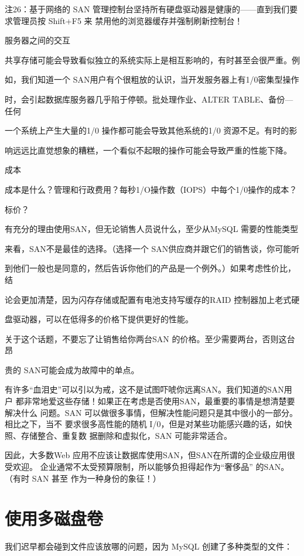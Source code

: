 注26：基于网络的 SAN 管理控制台坚持所有硬盘驱动器是健康的——直到我们要求管理员按 Shift+F5 来
禁用他的浏览器缓存并强制刷新控制台！

服务器之间的交互

共享存储可能会导致看似独立的系统实际上是相互影响的，有时甚至会很严重。例

如，我们知道一个 SAN用户有个很粗放的认识，当开发服务器上有1/0密集型操作

时，会引起数据库服务器几乎陷于停顿。批处理作业、ALTER TABLE、备份—任何

一个系统上产生大量的1/0 操作都可能会导致其他系统的1/0 资源不足。有时的影

响远远比直觉想象的糟糕，一个看似不起眼的操作可能会导致严重的性能下降。

成本

成本是什么？管理和行政费用？每秒1/O操作数（IOPS）中每个1/0操作的成本？

标价？

有充分的理由使用SAN，但无论销售人员说什么，至少从MySQL 需要的性能类型

来看，SAN不是最佳的选择。（选择一个 SAN供应商并跟它们的销售谈，你可能听

到他们一般也是同意的，然后告诉你他们的产品是一个例外。）如果考虑性价比，结

论会更加清楚，因为闪存存储或配置有电池支持写缓存的RAID 控制器加上老式硬

盘驱动器，可以在低得多的价格下提供更好的性能。

关于这个话题，不要忘了让销售给你两台SAN 的价格。至少需要两台，否则这台昂

贵的 SAN可能会成为故障中的单点。

有许多“血泪史”可以引以为戒，这不是试图吓唬你远离SAN。我们知道的SAN用户
都非常地爱这些存储！如果正在考虑是否使用SAN，最重要的事情是想清楚要解决什么
问题。SAN 可以做很多事情，但解决性能问题只是其中很小的一部分。相比之下，当不
要求很多高性能的随机 I/0，但是对某些功能感兴趣的话，如快照、存储整合、重复数
据删除和虚拟化，SAN 可能非常适合。

因此，大多数Web 应用不应该让数据库使用SAN，但SAN在所谓的企业级应用很受欢迎。
企业通常不太受预算限制，所以能够负担得起作为“奢侈品” 的SAN。（有时 SAN 甚至
作为一种身份的象征！）

\section{使用多磁盘卷}
我们迟早都会碰到文件应该放哪的问题，因为 MySQL 创建了多种类型的文件：

